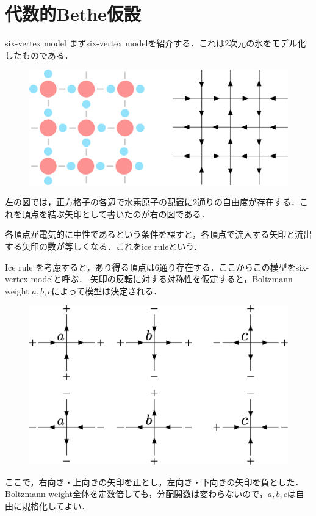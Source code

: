 \documentclass[\main/main.tex]{subfiles}
\begin{document}
\section{代数的Bethe仮設}
\begin{frame}{six-vertex model}
    まずsix-vertex modelを紹介する．これは2次元の氷をモデル化したものである．
    \begin{figure}[H]
        \centering
        \includegraphics[scale = 0.2]{2DIce.pdf}
    \end{figure}
    左の図では，正方格子の各辺で水素原子の配置に2通りの自由度が存在する．これを頂点を結ぶ矢印として書いたのが右の図である．

    各頂点が電気的に中性であるという条件を課すと，各頂点で流入する矢印と流出する矢印の数が等しくなる．これをice ruleという．
\end{frame}

\begin{frame}
    Ice rule を考慮すると，あり得る頂点は6通り存在する．ここからこの模型をsix-vertex modelと呼ぶ．
    矢印の反転に対する対称性を仮定すると，Boltzmann weight $a,b,c$によって模型は決定される．
    \begin{figure}[H]
        \centering
        \includegraphics[scale = 0.25]{6vertex.pdf}
    \end{figure}
    ここで，右向き・上向きの矢印を正とし，左向き・下向きの矢印を負とした．
    Boltzmann weight全体を定数倍しても，分配関数は変わらないので，$a, b, c$は自由に規格化してよい．
\end{frame}
\end{document}
